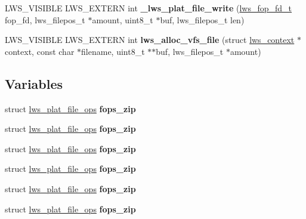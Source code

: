 \begin{DoxyCompactItemize}
\mbox{\label{group__fops_gaada01ab80e574a0a36d8536088fb944e}} 
L\+W\+S\+\_\+\+V\+I\+S\+I\+B\+LE L\+W\+S\+\_\+\+E\+X\+T\+E\+RN int {\bfseries \+\_\+lws\+\_\+plat\+\_\+file\+\_\+write} (\hyperlink{structlws__fop__fd}{lws\+\_\+fop\+\_\+fd\+\_\+t} fop\+\_\+fd, lws\+\_\+filepos\+\_\+t $\ast$amount, uint8\+\_\+t $\ast$buf, lws\+\_\+filepos\+\_\+t len)
\item 
\mbox{\label{group__fops_gabd005547fd12b5dcb91f28c5b5e5ccb4}} 
L\+W\+S\+\_\+\+V\+I\+S\+I\+B\+LE L\+W\+S\+\_\+\+E\+X\+T\+E\+RN int {\bfseries lws\+\_\+alloc\+\_\+vfs\+\_\+file} (struct \hyperlink{structlws__context}{lws\+\_\+context} $\ast$context, const char $\ast$filename, uint8\+\_\+t $\ast$$\ast$buf, lws\+\_\+filepos\+\_\+t $\ast$amount)
\end{DoxyCompactItemize}
\subsection*{Variables}
\begin{DoxyCompactItemize}
\item 
\mbox{\label{group__fops_gab390f4bbb86d55f984c0f2dc6a79ae71}} 
struct \hyperlink{structlws__plat__file__ops}{lws\+\_\+plat\+\_\+file\+\_\+ops} {\bfseries fops\+\_\+zip}
\item 
\mbox{\label{group__fops_gab390f4bbb86d55f984c0f2dc6a79ae71}} 
struct \hyperlink{structlws__plat__file__ops}{lws\+\_\+plat\+\_\+file\+\_\+ops} {\bfseries fops\+\_\+zip}
\item 
\mbox{\label{group__fops_gab390f4bbb86d55f984c0f2dc6a79ae71}} 
struct \hyperlink{structlws__plat__file__ops}{lws\+\_\+plat\+\_\+file\+\_\+ops} {\bfseries fops\+\_\+zip}
\item 
\mbox{\label{group__fops_gab390f4bbb86d55f984c0f2dc6a79ae71}} 
struct \hyperlink{structlws__plat__file__ops}{lws\+\_\+plat\+\_\+file\+\_\+ops} {\bfseries fops\+\_\+zip}
\item 
\mbox{\label{group__fops_gab390f4bbb86d55f984c0f2dc6a79ae71}} 
struct \hyperlink{structlws__plat__file__ops}{lws\+\_\+plat\+\_\+file\+\_\+ops} {\bfseries fops\+\_\+zip}
\item 
\mbox{\label{group__fops_gab390f4bbb86d55f984c0f2dc6a79ae71}} 
struct \hyperlink{structlws__plat__file__ops}{lws\+\_\+plat\+\_\+file\+\_\+ops} {\bfseries fops\+\_\+zip}
\end{DoxyCompactItemize}


